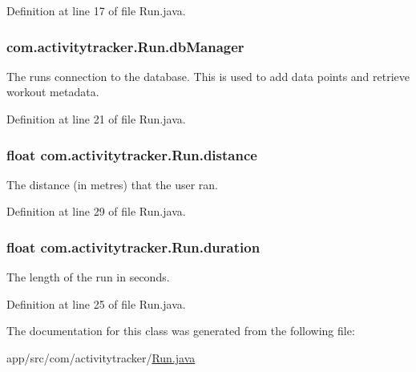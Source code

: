 Definition at line 17 of file Run.\+java.

\subsubsection[{\texorpdfstring{db\+Manager}{dbManager}}]{ com.\+activitytracker.\+Run.\+db\+Manager\hspace{0.3cm}{\ttfamily [package]}}\hypertarget{classcom_1_1activitytracker_1_1_run_ab90e32eda9f4c671ae3575f971edca6b}{}\label{classcom_1_1activitytracker_1_1_run_ab90e32eda9f4c671ae3575f971edca6b}
The run\textquotesingle{}s connection to the database. This is used to add data points and retrieve workout metadata. 

Definition at line 21 of file Run.\+java.

\subsubsection[{\texorpdfstring{distance}{distance}}]{\setlength{\rightskip}{0pt plus 5cm}float com.\+activitytracker.\+Run.\+distance\hspace{0.3cm}{\ttfamily [package]}}\hypertarget{classcom_1_1activitytracker_1_1_run_a7b4ca8c4ecea4da1653f03b8c8fc16a8}{}\label{classcom_1_1activitytracker_1_1_run_a7b4ca8c4ecea4da1653f03b8c8fc16a8}
The distance (in metres) that the user ran. 

Definition at line 29 of file Run.\+java.

\subsubsection[{\texorpdfstring{duration}{duration}}]{\setlength{\rightskip}{0pt plus 5cm}float com.\+activitytracker.\+Run.\+duration\hspace{0.3cm}{\ttfamily [package]}}\hypertarget{classcom_1_1activitytracker_1_1_run_a5e38d293d29d4b65c9290ff4bee82e03}{}\label{classcom_1_1activitytracker_1_1_run_a5e38d293d29d4b65c9290ff4bee82e03}
The length of the run in seconds. 

Definition at line 25 of file Run.\+java.



The documentation for this class was generated from the following file\+:\begin{DoxyCompactItemize}
\item 
app/src/com/activitytracker/\hyperlink{_run_8java}{Run.\+java}\end{DoxyCompactItemize}
